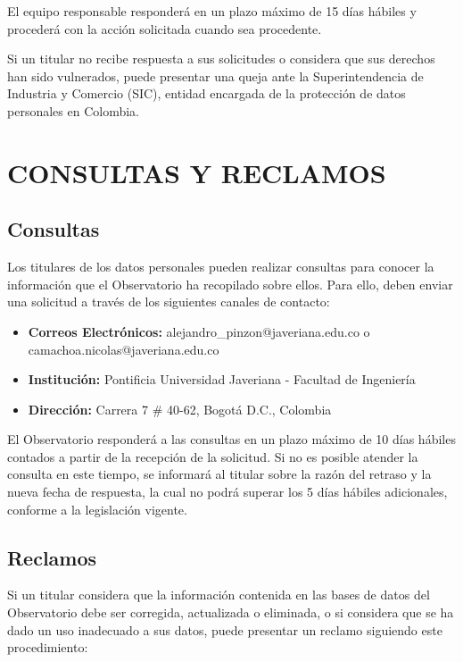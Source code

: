 \documentclass[11pt,oneside,letterpaper]{article}
\begin{document}
El equipo responsable responderá en un plazo máximo de 15 días hábiles y procederá con la acción solicitada cuando sea procedente.

Si un titular no recibe respuesta a sus solicitudes o considera que sus derechos han sido vulnerados, puede presentar una queja ante la Superintendencia de Industria y Comercio (SIC), entidad encargada de la protección de datos personales en Colombia.

\newpage

\section{CONSULTAS Y RECLAMOS}

\subsection{Consultas}

Los titulares de los datos personales pueden realizar consultas para conocer la información que el Observatorio ha recopilado sobre ellos. Para ello, deben enviar una solicitud a través de los siguientes canales de contacto:

\begin{itemize}
    \item \textbf{Correos Electrónicos:} alejandro\_pinzon@javeriana.edu.co o camachoa.nicolas@javeriana.edu.co
    \item \textbf{Institución:} Pontificia Universidad Javeriana - Facultad de Ingeniería
    \item \textbf{Dirección:} Carrera 7 \# 40-62, Bogotá D.C., Colombia
\end{itemize}

El Observatorio responderá a las consultas en un plazo máximo de 10 días hábiles contados a partir de la recepción de la solicitud. Si no es posible atender la consulta en este tiempo, se informará al titular sobre la razón del retraso y la nueva fecha de respuesta, la cual no podrá superar los 5 días hábiles adicionales, conforme a la legislación vigente.

\subsection{Reclamos}

Si un titular considera que la información contenida en las bases de datos del Observatorio debe ser corregida, actualizada o eliminada, o si considera que se ha dado un uso inadecuado a sus datos, puede presentar un reclamo siguiendo este procedimiento:
\end{document}
